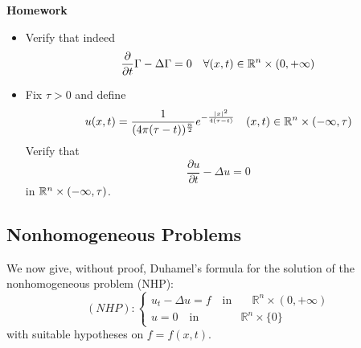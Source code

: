 \textbf{Homework}\\
\begin{itemize}
    \item Verify that indeed
    \begin{equation*}
        \frac{\partial}{\partial t} \Gamma - \Delta \Gamma = 0 \quad \forall (x,t) \in \mathbb{R}^n \times (0,+\infty)
    \end{equation*}
    \item Fix $\tau > 0$ and define 
    \begin{equation*}
        u(x,t) = \frac{1}{(4 \pi (\tau -t))^\frac{n}{2}} e^{-\frac{|x|^2}{4(\tau - t)}} \quad (x,t) \in \mathbb{R}^n \times (-\infty, \tau)
    \end{equation*}
    Verify that 
    \begin{equation*}
        \frac{\partial u}{\partial t} - \Delta u = 0
    \end{equation*}
    in $\mathbb{R}^n \times (-\infty, \tau)$.
\end{itemize}

\subsection{Nonhomogeneous Problems}

We now give, without proof, Duhamel's formula for the solution of the nonhomogeneous problem (NHP):
\begin{equation}\label{NHP}
(NHP):
    \begin{cases}
        u_t - \Delta u = f \quad \text{in} &\quad \mathbb{R}^n \times (0,+ \infty)\\
        u=0 \quad  \text{in} & \mathbb{R}^n \times \{0\}
    \end{cases}
\end{equation}
with suitable hypotheses on \( f =f(x,t). \)

